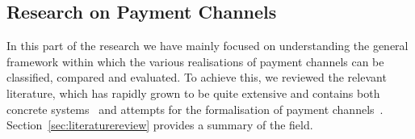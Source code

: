 \subsection{Research on Payment Channels}
  In this part of the research we have mainly focused on understanding the general
  framework within which the various realisations of payment channels can be classified,
  compared and evaluated. To achieve this, we reviewed the relevant literature, which has
  rapidly grown to be quite extensive and contains both concrete
  systems~\cite{abunchofthings} and attempts for the formalisation of payment
  channels~\cite{statechannels}. Section~\ref{sec:literaturereview} provides a summary of
  the field.
